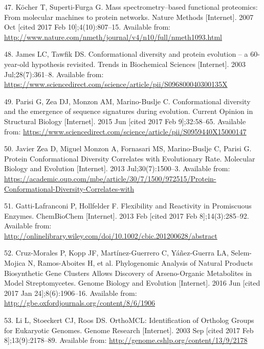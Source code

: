 \documentclass[12pt,twoside]{reedthesis}
\begin{document}
  \hypertarget{ref-kocher_mass_2007}{}
  47. Köcher T, Superti-Furga G. Mass spectrometry--based functional
  proteomics: From molecular machines to protein networks. Nature Methods
  {[}Internet{]}. 2007 Oct {[}cited 2017 Feb 10{]};4(10):807--15.
  Available from:
  \url{http://www.nature.com/nmeth/journal/v4/n10/full/nmeth1093.html}
  
  \hypertarget{ref-james_conformational_2003}{}
  48. James LC, Tawfik DS. Conformational diversity and protein evolution
  -- a 60-year-old hypothesis revisited. Trends in Biochemical Sciences
  {[}Internet{]}. 2003 Jul;28(7):361--8. Available from:
  \url{https://www.sciencedirect.com/science/article/pii/S096800040300135X}
  
  \hypertarget{ref-parisi_conformational_2015}{}
  49. Parisi G, Zea DJ, Monzon AM, Marino-Buslje C. Conformational
  diversity and the emergence of sequence signatures during evolution.
  Current Opinion in Structural Biology {[}Internet{]}. 2015 Jun {[}cited
  2017 Feb 9{]};32:58--65. Available from:
  \url{https://www.sciencedirect.com/science/article/pii/S0959440X15000147}
  
  \hypertarget{ref-javier_zea_protein_2013}{}
  50. Javier Zea D, Miguel Monzon A, Fornasari MS, Marino-Buslje C, Parisi
  G. Protein Conformational Diversity Correlates with Evolutionary Rate.
  Molecular Biology and Evolution {[}Internet{]}. 2013 Jul;30(7):1500--3.
  Available from:
  \url{https://academic.oup.com/mbe/article/30/7/1500/972515/Protein-Conformational-Diversity-Correlates-with}
  
  \hypertarget{ref-gatti-lafranconi_flexibility_2013}{}
  51. Gatti-Lafranconi P, Hollfelder F. Flexibility and Reactivity in
  Promiscuous Enzymes. ChemBioChem {[}Internet{]}. 2013 Feb {[}cited 2017
  Feb 8{]};14(3):285--92. Available from:
  \url{http://onlinelibrary.wiley.com/doi/10.1002/cbic.201200628/abstract}
  
  \hypertarget{ref-cruz-morales_phylogenomic_2016}{}
  52. Cruz-Morales P, Kopp JF, Martínez-Guerrero C, Yáñez-Guerra LA,
  Selem-Mojica N, Ramos-Aboites H, et al. Phylogenomic Analysis of Natural
  Products Biosynthetic Gene Clusters Allows Discovery of Arseno-Organic
  Metabolites in Model Streptomycetes. Genome Biology and Evolution
  {[}Internet{]}. 2016 Jun {[}cited 2017 Jan 24{]};8(6):1906--16.
  Available from: \url{http://gbe.oxfordjournals.org/content/8/6/1906}
  
  \hypertarget{ref-li_orthomcl_2003}{}
  53. Li L, Stoeckert CJ, Roos DS. OrthoMCL: Identification of Ortholog
  Groups for Eukaryotic Genomes. Genome Research {[}Internet{]}. 2003 Sep
  {[}cited 2017 Feb 8{]};13(9):2178--89. Available from:
  \url{http://genome.cshlp.org/content/13/9/2178}
  
\end{document}
